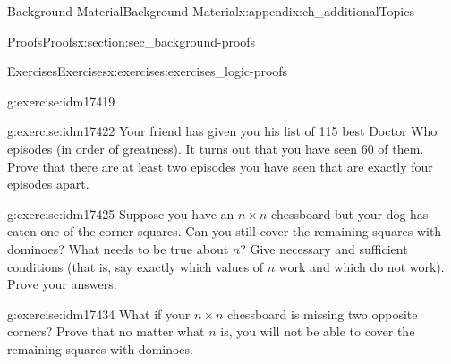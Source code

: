 \documentclass[oneside,10pt,]{book}
\numberwithin{equation}{chapter}
\begin{document}
\begin{appendixptx}{Background Material}{}{Background Material}{}{}{x:appendix:ch_additionalTopics}
\begin{sectionptx}{Proofs}{}{Proofs}{}{}{x:section:sec_background-proofs}
\begin{exercises-subsection}{Exercises}{}{Exercises}{}{}{x:exercises:exercises_logic-proofs}
\begin{divisionexercise}{17}{}{}{g:exercise:idm17419}
\end{divisionexercise}%
\begin{divisionexercise}{18}{}{}{g:exercise:idm17422}%
Your friend has given you his list of 115 best Doctor Who episodes (in order of greatness).  It turns out that you have seen 60 of them.  Prove that there are at least two episodes you have seen that are exactly four episodes apart.%
\end{divisionexercise}%
\begin{divisionexercise}{19}{}{}{g:exercise:idm17425}%
Suppose you have an \(n\times n\) chessboard but your dog has eaten one of the corner squares. Can you still cover the remaining squares with dominoes? What needs to be true about \(n\)? Give necessary and sufficient conditions (that is, say exactly which values of \(n\) work and which do not work). Prove your answers.%
\begin{sidebyside}{1}{0.4}{0.4}{0}%
\begin{sbspanel}{0.2}%
%
\end{sbspanel}%
\end{sidebyside}%
\end{divisionexercise}%
\begin{divisionexercise}{20}{}{}{g:exercise:idm17434}%
What if your \(n\times n\) chessboard is missing two opposite corners? Prove that no matter what \(n\) is, you will not be able to cover the remaining squares with dominoes.%
\begin{sidebyside}{1}{0.4}{0.4}{0}%
\begin{sbspanel}{0.2}%
%
\end{sbspanel}%

\end{sidebyside}
\end{divisionexercise}
\end{exercises-subsection}
\end{sectionptx}
\end{appendixptx}
\end{document}
